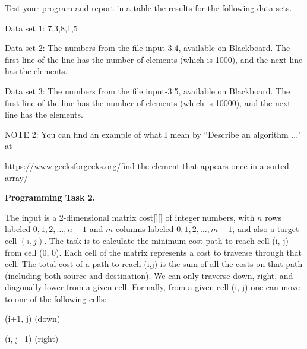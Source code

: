\documentclass[11pt]{article}
\begin{document}
Test your program and report in a table the results for the following data sets.

Data set 1:  7,3,8,1,5

Data set 2:  The  numbers from the file input-3.4, available on Blackboard. The first line of the line has the number of elements (which is 1000), and the next line has the elements.

Data set 3:  The  numbers from the file input-3.5, available on Blackboard. The first line of the line has the number of elements (which is 10000), and the next line has the elements.

 

 



















 
  
\bigskip


NOTE 2:  You can find an example of what I mean by  ``Describe an algorithm ..." at

\url{https://www.geeksforgeeks.org/find-the-element-that-appears-once-in-a-sorted-array/}


\newpage

\textbf{Programming Task 2.}


The input is a 2-dimensional  matrix cost[][] of integer numbers, with $n$ rows labeled $0,1, 2, \ldots, n-1$ and $m$ columns labeled $0,1,2,\ldots, m-1$, and also a target cell $(i,j)$. The task is to calculate the minimum cost path to reach cell (i, j) from cell (0, 0). Each cell of the matrix represents a cost to traverse through that cell. The total cost of a path to reach (i,j) is the sum of all the costs on that path (including both source and destination).
We can only traverse down, right,  and diagonally lower  from a given cell. Formally, from a given cell (i, j) one can move to one of the following cells: 

(i+1, j) (down)


(i, j+1) (right)
\end{document}
